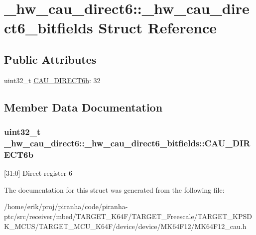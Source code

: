 \hypertarget{struct__hw__cau__direct6_1_1__hw__cau__direct6__bitfields}{}\section{\+\_\+hw\+\_\+cau\+\_\+direct6\+:\+:\+\_\+hw\+\_\+cau\+\_\+direct6\+\_\+bitfields Struct Reference}
\label{struct__hw__cau__direct6_1_1__hw__cau__direct6__bitfields}
\subsection*{Public Attributes}
\begin{DoxyCompactItemize}
\item 
uint32\+\_\+t \hyperlink{struct__hw__cau__direct6_1_1__hw__cau__direct6__bitfields_a661d8c30091f1203d9f81177ac84e00f}{C\+A\+U\+\_\+\+D\+I\+R\+E\+C\+T6b}\+: 32
\end{DoxyCompactItemize}


\subsection{Member Data Documentation}
\subsubsection[{\texorpdfstring{C\+A\+U\+\_\+\+D\+I\+R\+E\+C\+T6b}{CAU_DIRECT6b}}]{\setlength{\rightskip}{0pt plus 5cm}uint32\+\_\+t \+\_\+hw\+\_\+cau\+\_\+direct6\+::\+\_\+hw\+\_\+cau\+\_\+direct6\+\_\+bitfields\+::\+C\+A\+U\+\_\+\+D\+I\+R\+E\+C\+T6b}\hypertarget{struct__hw__cau__direct6_1_1__hw__cau__direct6__bitfields_a661d8c30091f1203d9f81177ac84e00f}{}\label{struct__hw__cau__direct6_1_1__hw__cau__direct6__bitfields_a661d8c30091f1203d9f81177ac84e00f}
\mbox{[}31\+:0\mbox{]} Direct register 6 

The documentation for this struct was generated from the following file\+:\begin{DoxyCompactItemize}
\item 
/home/erik/proj/piranha/code/piranha-\/ptc/src/receiver/mbed/\+T\+A\+R\+G\+E\+T\+\_\+\+K64\+F/\+T\+A\+R\+G\+E\+T\+\_\+\+Freescale/\+T\+A\+R\+G\+E\+T\+\_\+\+K\+P\+S\+D\+K\+\_\+\+M\+C\+U\+S/\+T\+A\+R\+G\+E\+T\+\_\+\+M\+C\+U\+\_\+\+K64\+F/device/device/\+M\+K64\+F12/M\+K64\+F12\+\_\+cau.\+h\end{DoxyCompactItemize}
